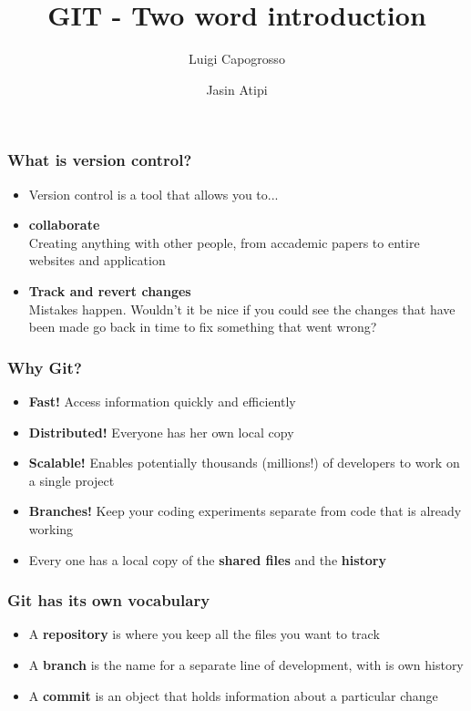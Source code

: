\documentclass{beamer}
\title{GIT - Two word introduction}
\author{Luigi Capogrosso \and Jasin Atipi}
\begin{document}
\begin{frame}
\maketitle
\end{frame}

\begin{frame}
\frametitle{What is version control?}
\begin{itemize}
\item <1-> Version control is a tool that allows you to...
\item <2-> \textbf{collaborate} \\ 
Creating anything with other people, from accademic papers to entire websites and application
\item <3-> \textbf{Track and revert changes} \\ 
Mistakes happen. Wouldn't it be nice if you could see the changes that have been made go back in time to fix something that went wrong?
\end{itemize}
\end{frame}

\begin{frame}
\frametitle{Why Git?}
\begin{itemize}
\item<1-> \textbf{Fast!} Access information quickly and efficiently
\item<2-> \textbf{Distributed!} Everyone has her own local copy
\item<3-> \textbf{Scalable!} Enables potentially thousands (millions!) of developers to work on a single project
\item<4-> \textbf{Branches!} Keep your coding experiments separate from code that is already working
\item<5-> Every one has a local copy of the \textbf{shared files} and the \textbf{history}
\end{itemize}
\end{frame}

\begin{frame}
\frametitle{Git has its own vocabulary}
\begin{itemize}
\item <1-> A \textbf{repository} is where you keep all the files you want to track
\item <2-> A \textbf{branch} is the name for a separate line of development, with is own history
\item <3-> A \textbf{commit} is an object that holds information about a particular change
\end{itemize}
\end{frame}
\end{document}
